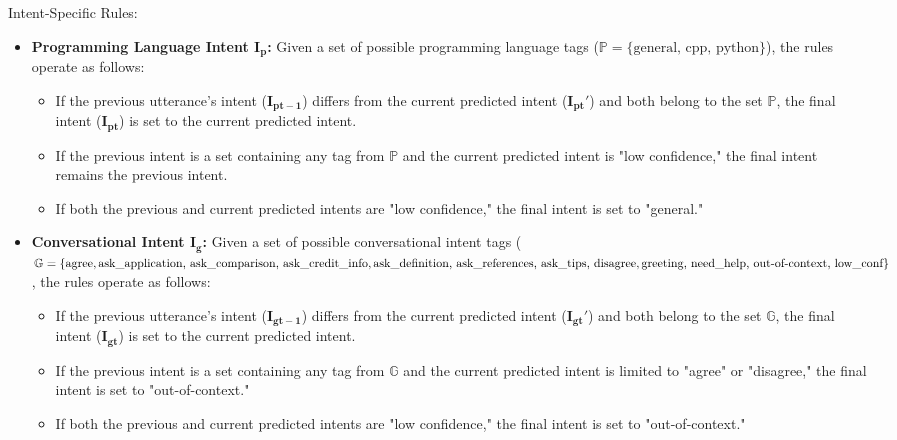 \documentclass[conference]{IEEEtran}
\begin{document}
    Intent-Specific Rules:
    \begin{itemize}
        \item \textbf{Programming Language Intent \(\mathbf{I_p}\):} Given a set of possible programming language tags (\(\mathbb{P} = \{\text{general, cpp, python}\}\)), the rules operate as follows:
            \begin{itemize}
                \item If the previous utterance's intent (\(\mathbf{I_{pt-1}}\)) differs from the current predicted intent (\(\mathbf{I_{pt}'}\)) and both belong to the set \(\mathbb{P}\), the final intent (\(\mathbf{I_{pt}}\)) is set to the current predicted intent.
                \item If the previous intent is a set containing any tag from \(\mathbb{P}\) and the current predicted intent is "low confidence," the final intent remains the previous intent.
                \item If both the previous and current predicted intents are "low confidence," the final intent is set to "general."
                \end{itemize}
        \item \textbf{Conversational Intent \(\mathbf{I_g}\): } Given a set of possible conversational intent tags (\(\mathbb{G} = \{
            \text{agree}, \linebreak 
            \text{ask\_application, ask\_comparison, ask\_credit\_info}, \linebreak
            \text{ask\_definition, ask\_references, ask\_tips, disagree}, \linebreak
            \text{greeting, need\_help, out-of-context, low\_conf}
            \}\), the rules operate as follows:
                \begin{itemize}
                    \item If the previous utterance's intent (\(\mathbf{I_{gt-1}}\)) differs from the current predicted intent (\(\mathbf{I_{gt}'}\)) and both belong to the set \(\mathbb{G}\), the final intent (\(\mathbf{I_{gt}}\)) is set to the current predicted intent.
                    \item If the previous intent is a set containing any tag from \(\mathbb{G}\) and the current predicted intent is limited to "agree" or "disagree," the final intent is set to "out-of-context."
                    \item If both the previous and current predicted intents are "low confidence," the final intent is set to "out-of-context."
                \end{itemize}
    \end{itemize}
\end{document}
